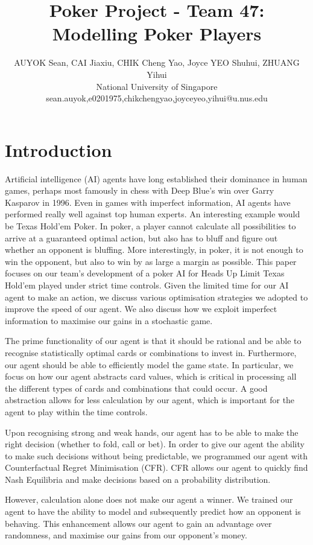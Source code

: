\documentclass{article}
\title{Poker Project - Team 47: Modelling Poker Players}
\author{
AUYOK Sean, CAI Jiaxiu, CHIK Cheng Yao, Joyce YEO Shuhui, ZHUANG Yihui
\\ 
National University of Singapore\\
%
sean.auyok,e0201975,chikchengyao,joyceyeo,yihui@u.nus.edu
}
\begin{document}
\maketitle

\section{Introduction}

Artificial intelligence (AI) agents have long established their 
dominance in human games, perhaps most famously in chess with 
Deep Blue's win over Garry Kasparov in 1996. Even in games with 
imperfect information, AI agents have performed really well against 
top human experts. An interesting example would be Texas Hold'em 
Poker. In poker, a player cannot calculate all possibilities to 
arrive at a guaranteed optimal action, but also has to bluff and 
figure out whether an opponent is bluffing. More interestingly, in 
poker, it is not enough to win the opponent, but also to win by as 
large a margin as possible. This paper focuses on our team's 
development of a poker AI for Heads Up Limit Texas Hold'em played 
under strict time controls. Given the limited time for our AI agent 
to make an action, we discuss various optimisation strategies 
we adopted to improve the speed of our agent. We also discuss how we 
exploit imperfect information to maximise our gains in a stochastic 
game.

The prime functionality of our agent is that it should be rational 
and be able to recognise statistically optimal cards or combinations 
to invest in. Furthermore, our agent should be able to efficiently 
model the game state. In particular, we focus on how our agent 
abstracts card values, which is critical in processing all the 
different types of cards and combinations that could occur. A good 
abstraction allows for less calculation by our agent, which is 
important for the agent to play within the time controls.

Upon recognising strong and weak hands, our agent has to be able to 
make the right decision (whether to fold, call or bet). In order to 
give our agent the ability to make such decisions without being 
predictable, we programmed our agent with Counterfactual Regret 
Minimisation (CFR). CFR allows our agent to quickly find Nash 
Equilibria and make decisions based on a probability distribution.

However, calculation alone does not make our agent a winner. We 
trained our agent to have the ability to model and subsequently 
predict how an opponent is behaving. This enhancement allows our 
agent to gain an advantage over randomness, and maximise our gains 
from our opponent's money.
\end{document}
